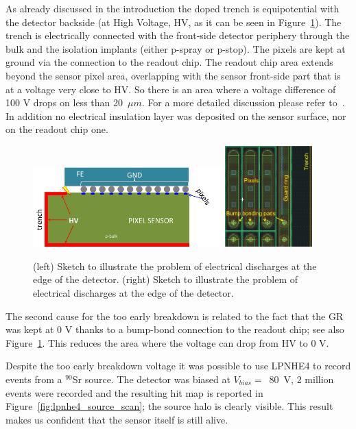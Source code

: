 As already discussed in the introduction the doped trench is equipotential with the detector backside (at High Voltage, HV, as it can be seen in Figure~\ref{fig:sparks}). The trench is electrically connected with the front-side detector periphery through the bulk 
and the isolation implants (either p-spray or p-stop). The pixels are kept at ground via the connection to the readout chip. The readout chip area extends beyond the sensor pixel area, overlapping with the sensor front-side part that is at a voltage very close to HV. So there is an area 
where a voltage difference of 100 V drops on less than 20~$\mu m$. For a more detailed discussion please refer to~\cite{rossi2006pixel}. In addition no electrical insulation layer was deposited on the sensor 
surface, nor on the readout chip one.
\begin{figure}[!htb]
\centering
\includegraphics[width=0.65\textwidth]{sparks.png}
\includegraphics[width=0.3\textwidth]{bbs_over_gr.png}
\caption{\label{fig:sparks}(left) Sketch to illustrate the problem of electrical discharges at the edge of the detector. (right) Sketch to illustrate the problem of electrical discharges at the edge of the detector.}
\end{figure}
The second cause for the too early breakdown is related to the fact that 
the GR was kept at 0 V thanks to a bump-bond connection to the 
readout chip; see also Figure~\ref{fig:sparks}. This reduces the area where the voltage can drop from HV to 0 V. 




Despite the too early breakdown voltage it was possible to use LPNHE4 to record events from a  $^{90}$Sr source. The detector was biased at  
$V_{bias} = $~80~V, 2 million events were recorded and the resulting 
hit map is reported in Figure~\ref{fig:lpnhe4_source_scan}; the source halo is clearly visible. This result makes us confident that the sensor itself is still alive.

